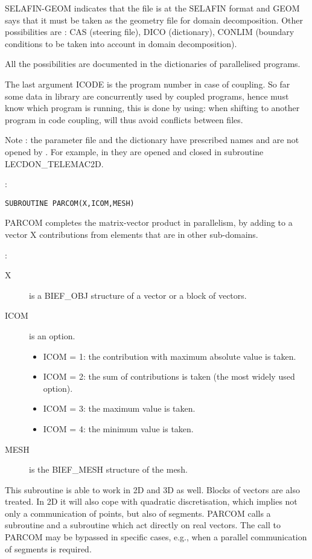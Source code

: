 SELAFIN-GEOM indicates that the file is at the SELAFIN format and GEOM says
that it must be taken as the geometry file for domain decomposition. Other
possibilities are : CAS (steering file), DICO (dictionary), CONLIM (boundary
conditions to be taken into account in domain decomposition).

All the possibilities are documented in the dictionaries of parallelised
programs.

The last argument ICODE is the program number in case of coupling. So far some
data in \bief library are concurrently used by coupled programs, hence \bief
must know which program is running, this is done by using:  when shifting to another program in code coupling,
 will thus avoid conflicts between files.

Note : the parameter file and the dictionary have prescribed names and are not
opened by . For example, in  they are
opened and closed in subroutine LECDON\_TELEMAC2D.

:
\begin{lstlisting}[language=TelFortran]
SUBROUTINE PARCOM(X,ICOM,MESH)
\end{lstlisting}

PARCOM completes the matrix-vector product in parallelism, by adding to a
vector X contributions from elements that are in other sub-domains.

:
\begin{description}
  \item [X] is a BIEF\_OBJ structure of a vector or a block of vectors.
  \item [ICOM] is an option.
    \begin{itemize}
      \item ICOM = 1:  the contribution with maximum absolute value is taken.
      \item ICOM = 2:  the sum of contributions is taken (the most widely used option).
      \item ICOM = 3: the maximum value is taken.
      \item ICOM = 4: the minimum value is taken.
    \end{itemize}
  \item [MESH] is the BIEF\_MESH structure of the mesh.
\end{description}

This subroutine is able to work in 2D and 3D as well. Blocks of vectors are
also treated. In 2D it will also cope with quadratic discretisation, which
implies not only a communication of points, but also of segments. PARCOM calls
a subroutine  and a subroutine  which act
directly on real vectors. The call to PARCOM may be bypassed in specific cases,
e.g., when a parallel communication of segments is required.

